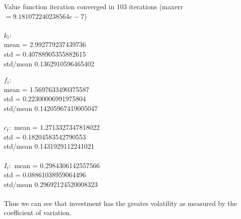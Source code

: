 \documentclass[12pt]{article}
\begin{document}
\begin{enumerate}
\begin{enumerate}
Value function iteration converged in 103 iterations (maxerr$=9.181072240238564e-7$)
\\\\
 $k_t:$ 
 \\mean = 2.992779237439736 
 \\std = 0.40788905355882615 
 \\std/mean 0.1362910596465402

 $f_t:$ 
\\ mean = 1.5697633490375587 
\\ std = 0.22300006991975804 
\\ std/mean 0.14205967419005047
\\
\\ $c_t:$ mean = 1.2713327347818022 
\\ std = 0.18204583542790553 
\\ std/mean 0.1431929112241021
\\
\\ $I_t:$ mean = 0.2984306142557566 
\\ std = 0.08861038959064496 
\\ std/mean 0.29692124520008323
\\\\
Thus we can see that investment has the greates volatility as measured by the coefficient of variation.
	\end{enumerate}
\end{enumerate} 
\end{document}
